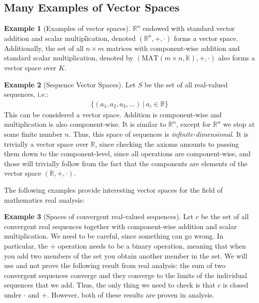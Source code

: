 \documentclass[11pt]{scrartcl}
\newcommand{\R}[0]{\mathbb{R}}
\theoremstyle{definition}
\newtheorem{ex}{Example}
\theoremstyle{remark}
\newcommand{\mat}[1]{\text{MAT}(m \times n, \mathbb{#1})}
\begin{document}
\subsection{Many Examples of Vector Spaces}

\begin{ex}[Examples of vector spaces]
	$\R^n$ endowed with standard vector addition and scalar multiplication, denoted $(\R^n, +, \cdot)$ forms a vector space. Additionally, the set of all $n \times m$ matrices with component-wise addition and standard scalar multiplication, denoted by $( \mat{K}, +, \cdot)$ also forms a vector space over $K$. 
\end{ex}

\begin{ex}[Sequence Vector Spaces]
	Let $S$ be the set of all real-valued sequences, i.e.: 
	\begin{align*}
		\{ (a_1, a_2, a_3, ...)\ |\ a_i \in \R \}	
	\end{align*}
	This can be considered a vector space. Addition is component-wise and multiplication is also component-wise. It is similar to $\R^n$, except for $\R^n$ we stop at some finite number $n$. Thus, this space of sequences is \emph{infinite-dimensional}. It is trivially a vector space over $\R$, since checking the axioms amounts to passing them down to the component-level, since all operations are component-wise, and those will trivially follow from the fact that the components are elements of the vector space $(\R, +, \cdot)$. 
\end{ex}

The following examples provide interesting vector spaces for the field of mathematics real analysis: 

\begin{ex}[Spaces of convergent real-valued sequences]
	Let $c$ be the set of all convergent real sequences together with component-wise addition and scalar multiplication. We need to be careful, since something can go wrong. In particular, the $+$ operation needs to be a binary operation, meaning that when you add two members of the set you obtain another member in the set. We will use and not prove the following result from real analysis: the sum of two convergent sequences converge and they converge to the limits of the individual sequences that we add. Thus, the only thing we need to check is that $c$ is closed under $\cdot$ and $+$. However, both of these results are proven in analysis. 
\end{ex}
\end{document}
